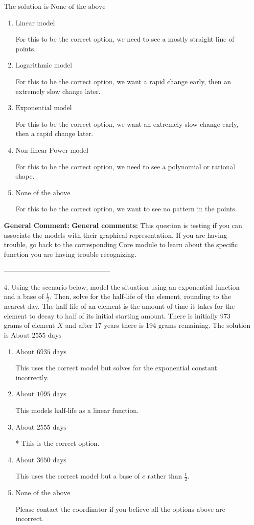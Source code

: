 \documentclass{extbook}[14pt]
\begin{document}
The solution is $ \text{None of the above} $ 

\begin{enumerate}[label=\Alph*.] 
\item $ \text{Linear model} $ 

 For this to be the correct option, we need to see a mostly straight line of points. 
\item $ \text{Logarithmic model} $ 

 For this to be the correct option, we want a rapid change early, then an extremely slow change later. 
\item $ \text{Exponential model} $ 

 For this to be the correct option, we want an extremely slow change early, then a rapid change later. 
\item $ \text{Non-linear Power model} $ 

 For this to be the correct option, we need to see a polynomial or rational shape. 
\item $ \text{None of the above} $ 

 For this to be the correct option, we want to see no pattern in the points. 
\end{enumerate} 
 
\textbf{General Comment:} \textbf{General comments:} This question is testing if you can associate the models with their graphical representation. If you are having trouble, go back to the corresponding Core module to learn about the specific function you are having trouble recognizing. 

-----------------------------------------------

4. Using the scenario below, model the situation using an exponential function and a base of $\frac{1}{2}$. Then, solve for the half-life of the element, rounding to the nearest day.
The half-life of an element is the amount of time it takes for the element to decay to half of its initial starting amount. There is initially 973 grams of element $X$ and after 17 years there is 194 grams remaining. 
The solution is $ \text{About } 2555 \text{ days} $ 

\begin{enumerate}[label=\Alph*.] 
\item $ \text{About } 6935 \text{ days} $ 

 This uses the correct model but solves for the exponential constant incorrectly. 
\item $ \text{About } 1095 \text{ days} $ 

 This models half-life as a linear function. 
\item $ \text{About } 2555 \text{ days} $ 

 * This is the correct option. 
\item $ \text{About } 3650 \text{ days} $ 

 This uses the correct model but a base of $e$ rather than $\frac{1}{2}$. 
\item $ \text{None of the above} $ 

 Please contact the coordinator if you believe all the options above are incorrect. 
\end{enumerate} 
 
\end{document}
